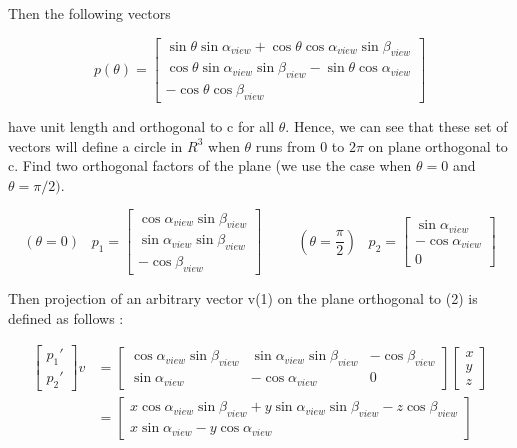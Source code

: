 \documentclass[]{article}
\begin{document}
Then the following vectors 

\begin{equation*}
p(\theta)=\left[\begin{array}{ccc}
\sin \theta \sin \alpha_{view}+\cos \theta \cos \alpha_{view} \sin \beta_{view} \\ 
\cos \theta \sin \alpha_{view} \sin \beta_{view} - \sin \theta \cos \alpha_{view} \\
-\cos\theta \cos \beta_{view}
\end{array}\right]
\end{equation*}

have unit length and orthogonal to c for all $\theta$. Hence, we can see that these set of vectors will define a circle in $R^3$ when $\theta$ runs from $0$ to $2\pi$ on plane orthogonal to c. Find two orthogonal factors of the plane (we use the case when $\theta=0$ and $\theta=\pi/2)$.


\[
(\theta=0) \hspace{10pt} p_1=\left[ 
\begin{array}{c}
\cos \alpha_{view} \sin \beta_{view}\\
\sin \alpha_{view} \sin \beta_{view}\\
- \cos \beta_{view}
\end{array}
\right]\hspace{30pt}(\theta=\frac{\pi}{2}) \hspace{10pt} 
p_2=\left[ 
\begin{array}{c}
\sin \alpha_{view}\\
-\cos \alpha_{view}\\
0
\end{array}
\right]\]



Then projection of an arbitrary vector v(1) on the plane orthogonal to (2) is defined as follows : 
	
\begin{equation}
\begin{split}
\left[ 
\begin{array}{c}
p_1' \\ 
p_2'
\end{array}
\right]v
&=
\left[ 
\begin{array}{ccc}
\cos \alpha_{view} \sin \beta_{view}  & \sin \alpha_{view} \sin \beta_{view}  & -\cos \beta_{view}  \\ 
\sin \alpha_{view}  & -\cos \alpha_{view}  & 0%
\end{array}%
\right] \left[ 
\begin{array}{c}
x \\ 
y \\ 
z%
\end{array}%
\right]\\
&=\left[ 
\begin{array}{c}
x\cos \alpha_{view} \sin \beta_{view} + y\sin \alpha_{view} \sin \beta_{view} -z\cos \beta_{view}  \\ 
x\sin \alpha_{view} -y\cos \alpha_{view} 
\end{array}%
\right]
 \end{split}
\end{equation}\label{eq3}
\end{document}
